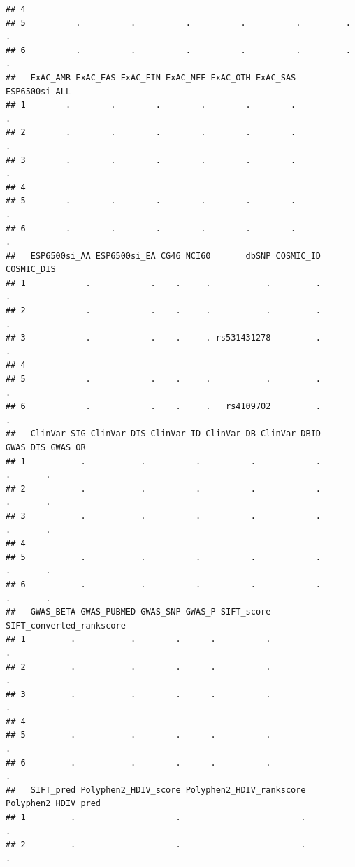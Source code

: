 \documentclass[
]{article}
\begin{document}
\begin{verbatim}
## 4                                                                          
## 5          .          .          .          .          .         .        .
## 6          .          .          .          .          .         .        .
##   ExAC_AMR ExAC_EAS ExAC_FIN ExAC_NFE ExAC_OTH ExAC_SAS ESP6500si_ALL
## 1        .        .        .        .        .        .             .
## 2        .        .        .        .        .        .             .
## 3        .        .        .        .        .        .             .
## 4                                                                    
## 5        .        .        .        .        .        .             .
## 6        .        .        .        .        .        .             .
##   ESP6500si_AA ESP6500si_EA CG46 NCI60       dbSNP COSMIC_ID COSMIC_DIS
## 1            .            .    .     .           .         .          .
## 2            .            .    .     .           .         .          .
## 3            .            .    .     . rs531431278         .          .
## 4                                                                      
## 5            .            .    .     .           .         .          .
## 6            .            .    .     .   rs4109702         .          .
##   ClinVar_SIG ClinVar_DIS ClinVar_ID ClinVar_DB ClinVar_DBID GWAS_DIS GWAS_OR
## 1           .           .          .          .            .        .       .
## 2           .           .          .          .            .        .       .
## 3           .           .          .          .            .        .       .
## 4                                                                            
## 5           .           .          .          .            .        .       .
## 6           .           .          .          .            .        .       .
##   GWAS_BETA GWAS_PUBMED GWAS_SNP GWAS_P SIFT_score SIFT_converted_rankscore
## 1         .           .        .      .          .                        .
## 2         .           .        .      .          .                        .
## 3         .           .        .      .          .                        .
## 4                                                                          
## 5         .           .        .      .          .                        .
## 6         .           .        .      .          .                        .
##   SIFT_pred Polyphen2_HDIV_score Polyphen2_HDIV_rankscore Polyphen2_HDIV_pred
## 1         .                    .                        .                   .
## 2         .                    .                        .                   .

\end{verbatim}
\end{document}
